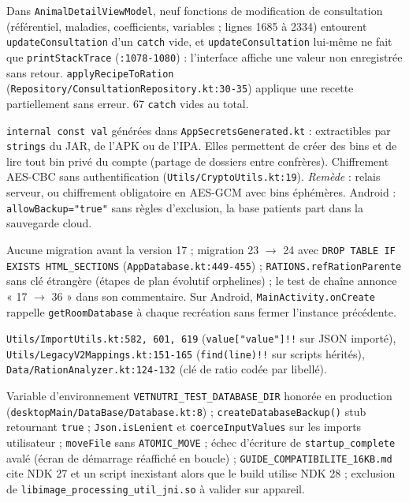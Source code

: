 \documentclass[11pt,a4paper]{article}
\newcommand{\fichier}[1]{\texttt{\small #1}}
\newcommand{\code}[1]{\texttt{#1}}
\newcommand{\sev}[1]{\textbf{#1}}
\begin{document}
\begin{description}[style=nextline]
\item[\sev{Majeur} --- Erreurs silencieuses sur des enregistrements cliniques.]
  Dans \code{AnimalDetailViewModel}, neuf fonctions de modification de consultation (référentiel,
  maladies, coefficients, variables ; lignes 1685 à 2334) entourent \code{updateConsultation}
  d'un \code{catch} vide, et \code{updateConsultation} lui-même ne fait que \code{printStackTrace}
  (\code{:1078-1080}) : l'interface affiche une valeur non enregistrée sans retour.
  \code{applyRecipeToRation} (\fichier{Repository/ConsultationRepository.kt:30-35}) applique une
  recette partiellement sans erreur. 67 \code{catch} vides au total.

\item[\sev{Majeur} --- Clés jsonbin embarquées dans les binaires.]
  \code{internal const val} générées dans \code{AppSecretsGenerated.kt} : extractibles par
  \code{strings} du JAR, de l'APK ou de l'IPA. Elles permettent de créer des bins et de lire tout
  bin privé du compte (partage de dossiers entre confrères). Chiffrement AES-CBC sans
  authentification (\fichier{Utils/CryptoUtils.kt:19}). \emph{Remède} : relais serveur, ou
  chiffrement obligatoire en AES-GCM avec bins éphémères. Android : \code{allowBackup="true"}
  sans règles d'exclusion, la base patients part dans la sauvegarde cloud.

\item[\sev{Majeur} --- Migrations.]
  Aucune migration avant la version 17 ; migration 23 $\rightarrow$ 24 avec
  \code{DROP TABLE IF EXISTS HTML\_SECTIONS} (\fichier{AppDatabase.kt:449-455}) ;
  \code{RATIONS.refRationParente} sans clé étrangère (étapes de plan évolutif orphelines) ; le test
  de chaîne annonce « 17 $\rightarrow$ 36 » dans son commentaire. Sur Android,
  \code{MainActivity.onCreate} rappelle \code{getRoomDatabase} à chaque recréation sans fermer
  l'instance précédente.

\item[\sev{Majeur} --- \code{!!} sur des entrées externes.]
  \fichier{Utils/ImportUtils.kt:582, 601, 619} (\code{value["value"]!!} sur JSON importé),
  \fichier{Utils/LegacyV2Mappings.kt:151-165} (\code{find(line)!!} sur scripts hérités),
  \fichier{Data/RationAnalyzer.kt:124-132} (clé de ratio codée par libellé).

\item[\sev{Mineur} --- Divers.]
  Variable d'environnement \code{VETNUTRI\_TEST\_DATABASE\_DIR} honorée en production
  (\fichier{desktopMain/DataBase/Database.kt:8}) ; \code{createDatabaseBackup()} stub retournant
  \code{true} ; \code{Json.isLenient} et \code{coerceInputValues} sur les imports utilisateur ;
  \code{moveFile} sans \code{ATOMIC\_MOVE} ; échec d'écriture de \code{startup\_complete} avalé
  (écran de démarrage réaffiché en boucle) ; \fichier{GUIDE\_COMPATIBILITE\_16KB.md} cite NDK 27
  et un script inexistant alors que le build utilise NDK 28 ; exclusion de
  \code{libimage\_processing\_util\_jni.so} à valider sur appareil.
\end{description}
\end{document}
